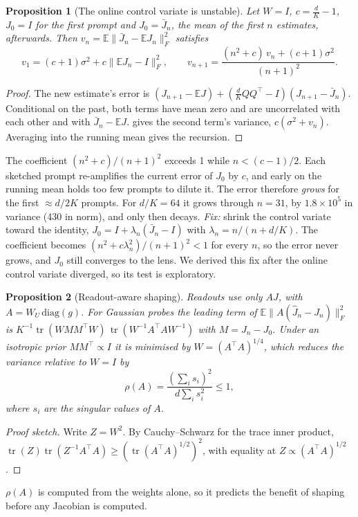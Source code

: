 \documentclass[11pt]{article}
\newtheorem{proposition}{Proposition}
\theoremstyle{definition}
\newcommand{\E}{\mathbb{E}}
\newcommand{\tr}{\operatorname{tr}}
\begin{document}
\begin{proposition}[The online control variate is unstable]
\label{prop:online}
Let $W=I$, $c=\frac{d}{K}-1$, $J_0=I$ for the first prompt and $J_0=\bar J_n$, the mean of the first $n$
estimates, afterwards. Then $v_n=\E\|\bar J_n-\E J_n\|_F^2$ satisfies
\begin{equation}
v_1=(c+1)\sigma^2+c\|\E J_n-I\|_F^2,\qquad
v_{n+1}=\frac{(n^2+c)\,v_n+(c+1)\sigma^2}{(n+1)^2}.
\end{equation}
\end{proposition}
\begin{proof}
The new estimate's error is $(J_{n+1}-\E J)+(\frac{d}{K}QQ^{\top}-I)(J_{n+1}-\bar J_n)$. Conditional on
the past, both terms have mean zero and are uncorrelated with each other and with $\bar J_n-\E J$.
 gives the second term's variance, $c(\sigma^2+v_n)$. Averaging into the running mean
gives the recursion.
\end{proof}
The coefficient $(n^2+c)/(n+1)^2$ exceeds 1 while $n<(c-1)/2$. Each sketched prompt re-amplifies the
current error of $J_0$ by $c$, and early on the running mean holds too few prompts to dilute it.
The error therefore \emph{grows} for the first $\approx d/2K$ prompts. For $d/K=64$ it grows through
$n=31$, by $1.8\times10^5$ in variance (430 in norm), and only then decays.
\emph{Fix:} shrink the control variate toward the identity, $J_0=I+\lambda_n(\bar J_n-I)$ with
$\lambda_n=n/(n+d/K)$. The coefficient becomes $(n^2+c\lambda_n^2)/(n+1)^2<1$ for every $n$, so the error
never grows, and $J_0$ still converges to the lens. We derived this fix after the online control
variate diverged, so its test is exploratory.

\begin{proposition}[Readout-aware shaping]
\label{prop:shape}
Readouts use only $AJ$, with $A=W_U\,\mathrm{diag}(g)$. For Gaussian probes the leading term of
$\E\|A(\hat J_n-J_n)\|_F^2$ is $K^{-1}\tr(WMM^{\top}W)\,\tr(W^{-1}A^{\top}AW^{-1})$ with $M=J_n-J_0$.
Under an isotropic prior $MM^{\top}\propto I$ it is minimised by $W=(A^{\top}A)^{1/4}$, which reduces
the variance relative to $W=I$ by
\begin{equation}
\rho(A)=\frac{(\sum_i s_i)^2}{d\sum_i s_i^2}\le 1,
\end{equation}
where $s_i$ are the singular values of $A$.
\end{proposition}
\begin{proof}[Proof sketch]
Write $Z=W^2$. By Cauchy--Schwarz for the trace inner product,
$\tr(Z)\tr(Z^{-1}A^{\top}A)\ge(\tr(A^{\top}A)^{1/2})^2$, with equality at $Z\propto(A^{\top}A)^{1/2}$.
\end{proof}
$\rho(A)$ is computed from the weights alone, so it predicts the benefit of shaping before any
Jacobian is computed.
\end{document}

